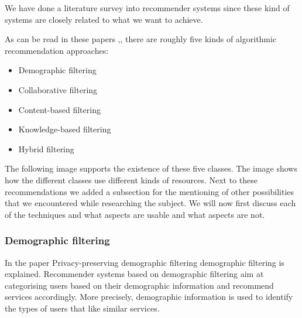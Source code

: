 \documentclass[]{article}
\begin{document}
We have done a literature survey into recommender systems since these kind of systems are closely related to what we want to achieve.

As can be read in these papers \citep{Breese1998},\citep{Peter2007}, there are roughly five kinds of algorithmic recommendation approaches:

\begin{itemize}
\item Demographic filtering \citep{Peter2007}
\item Collaborative filtering \citep{Peter2007}\citep{Breese1998}
\item Content-based filtering \citep{Peter2007}
\item Knowledge-based filtering \citep{Peter2007}\cite{burke2000knowledge}
\item Hybrid filtering \citep{Peter2007}
\end{itemize}

The following image supports the existence of these five classes.
The image shows how the different classes use different kinds of resources.
Next to these recommendations we added a subsection for the mentioning of other possibilities that we encountered while researching the subject.
We will now first discuss each of the techniques and what aspects are usable and what aspects are not.

\subsubsection{Demographic filtering}
In the paper Privacy-preserving demographic filtering\cite{aimeur2006privacy} demographic filtering is explained.
Recommender systems based on demographic filtering aim at categorising users based on their demographic information and recommend services accordingly. 
More precisely, demographic information is used to identify the types of users that like similar services. 
\end{document}
